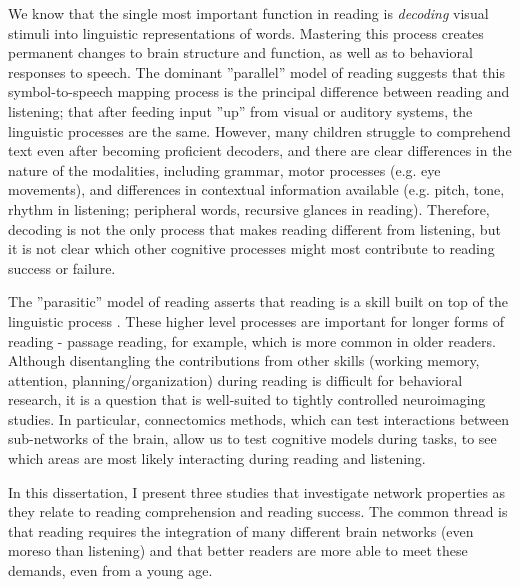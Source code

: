 We know that the single most important function in reading is \textit{decoding} visual stimuli into linguistic representations of words. Mastering this process creates permanent changes to brain structure and function, as well as to behavioral responses to speech. The dominant ''parallel'' model of reading suggests that this symbol-to-speech mapping process is the principal difference between reading and listening; that after feeding input ''up'' from visual or auditory systems, the linguistic processes are the same. However, many children struggle to comprehend text even after becoming proficient decoders, and there are clear differences in the nature of the modalities, including grammar, motor processes (e.g. eye movements), and differences in contextual information available (e.g. pitch, tone, rhythm in listening; peripheral words, recursive glances in reading). Therefore, decoding is not the only process that makes reading different from listening, but it is not clear which other cognitive processes might most contribute to reading success or failure. 

The ''parasitic'' model of reading asserts that reading is a skill built on top of the linguistic process \citep{Mattingly1972}. These higher level processes are important for longer forms of reading - passage reading, for example, which is more common in older readers. Although disentangling the contributions from other skills (working memory, attention, planning/organization) during reading is difficult for behavioral research, it is a question that is well-suited to tightly controlled neuroimaging studies. In particular, connectomics methods, which can test interactions between sub-networks of the brain, allow us to test cognitive models during tasks, to see which areas are most likely interacting during reading and listening. 

In this dissertation, I present three studies that investigate network properties as they relate to reading comprehension and reading success. The common thread is that reading requires the integration of many different brain networks (even moreso than listening) and that better readers are more able to meet these demands, even from a young age.

